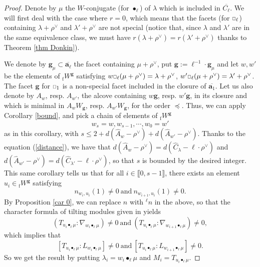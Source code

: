 \documentclass[11pt]{amsart}
\theoremstyle{plain}
\theoremstyle{remark}
\newcommand{\car}{\mbox{\relsize{-5}$\Box$}}
\numberwithin{equation}{section}
\begin{document}
	\begin{proof}
		Denote by $\mu$ the $W$-conjugate (for $\bullet_\ell$) of $\lambda$ which is included in $\overline{C_\ell}$. We will first deal with the case where $r=0$, which means that the facets (for $\car_\ell$) containing $\lambda+\rho^\vee$ and $\lambda'+\rho^\vee$ are not special (notice that, since $\lambda$ and $\lambda'$ are in the same equivalence class, we must have $r(\lambda+\rho^\vee)=r(\lambda'+\rho^\vee)$ thanks to Theorem \ref{thm Donkin}). 
		
		We denote by $\mathbf{g}_\mu\subset\overline{\mathbf{a}_\ell}$ the facet containing $\mu+\rho^\vee$, put $\mathbf{g}:=\ell^{-1}\cdot \mathbf{g}_\mu$ and let $w,w'$ be the elements of ${_\mathrm{f}W^{\mathbf{g}}}$ satisfying $w\car_\ell(\mu+\rho^\vee)=\lambda+\rho^\vee$, $w'\car_\ell(\mu+\rho^\vee)=\lambda'+\rho^\vee$. The facet $\mathbf{g}$ for $\car_1$ is a non-special facet included in the closure of $\overline{\mathbf{a}_1}$. Let us also denote by $A_w$, resp. $A_{w'}$, the alcove containing $w\mathbf{g}$, resp. $w'\mathbf{g}$, in its closure and which is minimal in $A_wW_\mathbf{g}$, resp. $A_{w'}W_\mathbf{g}$, for the order $\preceq$. Thus, we can apply Corollary \ref{bound}, and pick a chain of elements of ${_\mathrm{f}W}^\mathbf{g}$
		$$w_s=w,w_{s-1},\cdots,w_0=w' $$
		as in this corollary, with $s\leq 2+d(\hat{A}_w-\rho^\vee)+d(\hat{A}_{w'}-\rho^\vee)$. Thanks to the equation (\ref{distance}), we have that $d(\hat{A}_w-\rho^\vee)=d(\hat{C}_{\lambda}-\ell\cdot\rho^\vee)$ and $d(\hat{A}_{w'}-\rho^\vee)=d(\hat{C}_{\lambda'}-\ell\cdot\rho^\vee)$, so that $s$ is bounded by the desired integer.
		This same corollary tells us that for all $i\in\llbracket 0,s-1\rrbracket$, there exists an element $u_i\in {_\mathrm{f}W}^\mathbf{g}$ satisfying 
		$$n_{w_i,u_i}(1)\neq 0~\text{and}~n_{w_{i+1},u_i}(1)\neq 0. $$
		By Proposition \ref{car 0}, we can replace $n$ with ${^\ell n}$ in the above, so that the character formula of tilting modules given in \cite[Theorem 8.9]{riche2020smithtreumann} yields 
		$$(T_{u_i\bullet_\ell\mu}:\nabla_{w_i\bullet_\ell\mu})\neq0~\text{and}~(T_{u_i\bullet_\ell\mu}:\nabla_{w_{i+1}\bullet_\ell\mu})\neq0, $$
		which implies that 
		$$[T_{u_i\bullet_\ell\mu}:L_{w_i\bullet_\ell\mu}]\neq0~\text{and}~[T_{u_i\bullet_\ell\mu}:L_{w_{i+1}\bullet_\ell\mu}]\neq0. $$
		So we get the result by putting $\lambda_i=w_i\bullet_\ell\mu$ and $M_i=T_{u_i\bullet_\ell\mu}$.
		

\end{proof}
\end{document}
